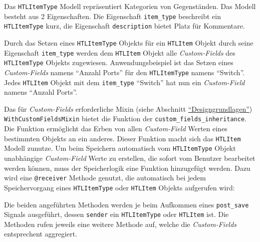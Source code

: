Das \texttt{HTLItemType} Modell repräsentiert Kategorien von
Gegenständen. Das Modell besteht aus 2 Eigenschaften. Die Eigenschaft
\texttt{item\_type} beschreibt ein \texttt{HTLItemType} kurz, die
Eigenschaft \texttt{description} bietet Platz für Kommentare.

Durch das Setzen eines \texttt{HTLItemType} Objekts für ein
\texttt{HTLItem} Objekt durch seine Eigenschaft \texttt{item\_type}
werden dem \texttt{HTLItem} Objekt alle
\emph{Custom-Fields}
des \texttt{HTLItemType} Objekts zugewiesen. Anwendungsbeispiel ist das
Setzen eines
\emph{Custom-Fields}
namens ``Anzahl Ports'' für den \texttt{HTLItemType} namens ``Switch''.
Jedes \texttt{HTLItem} Objekt mit dem \texttt{item\_type} ``Switch'' hat
nun ein \emph{Custom-Field} namens ``Anzahl Ports''.

Das für
\emph{Custom-Fields}
erforderliche Mixin (siehe Abschnitt
\protect\hyperlink{designgrundlagen}{``Designgrundlagen''})
\texttt{WithCustomFieldsMixin} bietet die Funktion der
\texttt{custom\_fields\_inheritance}. Die Funktion ermöglicht das Erben
von allen \emph{Custom-Field} Werten eines bestimmten Objekts an ein
anderes. Dieser Funktion macht sich das \texttt{HTLItem} Modell zunutze.
Um beim Speichern automatisch vom \texttt{HTLItemType} Objekt
unabhängige \emph{Custom-Field} Werte zu erstellen, die sofort vom
Benutzer bearbeitet werden können, muss der Speicherlogik eine Funktion
hinzugefügt werden. Dazu wird eine \texttt{@receiver} Methode genutzt,
die automatisch bei jedem Speichervorgang eines \texttt{HTLItemType}
oder \texttt{HTLItem} Objekts aufgerufen wird:

\begin{Shaded}
\begin{Highlighting}[]
\OperatorTok{=}
\OperatorTok{**}
    
\OperatorTok{=}
\OperatorTok{**}
\end{Highlighting}
\end{Shaded}

Die beiden angeführten Methoden werden je beim Aufkommen eines
\texttt{post\_save} Signals \cite{django-doku-signals} ausgeführt,
dessen \texttt{sender} ein \texttt{HTLItemType} oder \texttt{HTLItem}
ist. Die Methoden rufen jeweils eine weitere Methode auf, welche die
\emph{Custom-Fields} entsprechent aggregiert.
